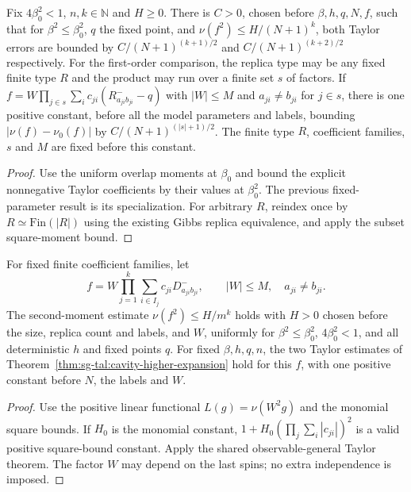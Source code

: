 \begin{lemma}
\label{lem:sg-tal:cavity-uniform-finite}
\leanok
{}
Fix $4\beta_0^2<1$, $n,k\in\mathbb N$ and $H\ge0$. There is $C>0$, chosen before
$\beta,h,q,N,f$, such that for $\beta^2\le\beta_0^2$, $q$ the fixed point, and
$\nu(f^2)\le H/(N+1)^k$, both Taylor errors are bounded by
$C/(N+1)^{(k+1)/2}$ and $C/(N+1)^{(k+2)/2}$ respectively.
For the first-order comparison, the replica type may be any fixed finite type $R$ and
the product may run over a finite set $s$ of factors. If
$f=W\prod_{j\in s}\sum_i c_{ji}(R^-_{a_{ji}b_{ji}}-q)$ with $|W|\le M$ and
$a_{ji}\ne b_{ji}$ for $j\in s$, there is one positive constant, before all the model
parameters and labels, bounding $|\nu(f)-\nu_0(f)|$ by $C/(N+1)^{(|s|+1)/2}$.
The finite type $R$, coefficient families, $s$ and $M$ are fixed before this constant.
\end{lemma}
\begin{proof}
\leanok
Use the uniform overlap moments at $\beta_0$ and bound the explicit nonnegative Taylor
coefficients by their values at $\beta_0^2$. The previous fixed-parameter result is its
specialization. For arbitrary $R$, reindex once by $R\simeq\mathrm{Fin}(|R|)$ using
the existing Gibbs replica equivalence, and apply the subset square-moment bound.
\end{proof}

\begin{theorem}
\label{thm:sg-tal:cavity-higher-linear-moments}
\leanok
{}
For fixed finite coefficient families, let
\[
 f=W\prod_{j=1}^k\sum_{i\in I_j}c_{ji}D^-_{a_{ji}b_{ji}},
 \qquad |W|\le M,\quad a_{ji}\ne b_{ji}.
\]
The second-moment estimate $\nu(f^2)\le H/m^k$ holds with $H>0$ chosen
before the size, replica count and labels, and $W$, uniformly for
$\beta^2\le\beta_0^2$, $4\beta_0^2<1$, and all deterministic $h$ and fixed points $q$.
For fixed $\beta,h,q,n$, the two Taylor estimates of
Theorem~\ref{thm:sg-tal:cavity-higher-expansion} hold for this $f$, with one
positive constant before $N$, the labels and $W$.
\end{theorem}
\begin{proof}
\leanok
Use the positive linear functional $L(g)=\nu(W^2g)$ and the monomial square bounds.
If $H_0$ is the monomial constant, $1+H_0(\prod_j\sum_i|c_{ji}|)^2$ is a valid
positive square-bound constant. Apply the shared observable-general Taylor theorem.
The factor $W$ may depend on the last spins; no extra independence is imposed.
\end{proof}

